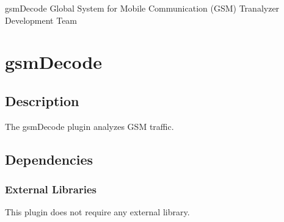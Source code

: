 \documentclass[documentation]{subfiles}
\begin{document}
\trantitle
    {gsmDecode} %
    {Global System for Mobile Communication (GSM)} %
    {Tranalyzer Development Team} %

\section{gsmDecode}\label{s:gsmDecode}

\subsection{Description}
The gsmDecode plugin analyzes GSM traffic.

\subsection{Dependencies}

\subsubsection{External Libraries}
This plugin does not require any external library.

\end{document}
